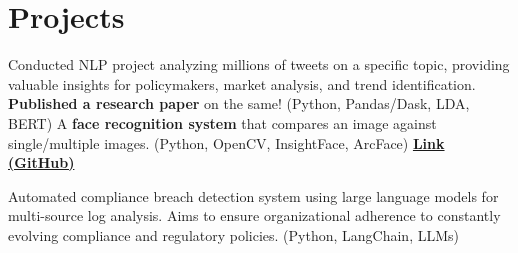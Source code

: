 \section{Projects}
  \resumeSubHeadingListStart
      {Conducted NLP project analyzing millions of tweets on a specific topic, providing valuable insights for policymakers, market analysis, and trend identification. \textbf{Published a research paper} on the same! (Python, Pandas/Dask, LDA, BERT)}
      {A \textbf{face recognition system} that compares an image against single/multiple images. (Python, OpenCV, InsightFace, ArcFace) \href{https://github.com/hari01584/faceai-insightfaces}{\textbf{Link (GitHub)}}}


      {Automated compliance breach detection system using large language models for multi-source log analysis. Aims to ensure organizational adherence to constantly evolving compliance and regulatory policies. (Python, LangChain, LLMs)}


  \resumeSubHeadingListEnd